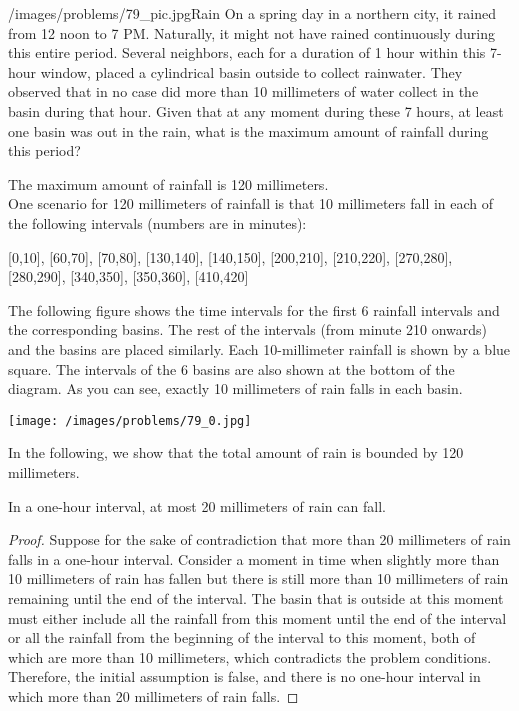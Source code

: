 \begin{problem}{/images/problems/79_pic.jpg}{Rain} On a spring day in a northern city, it rained from 12 noon to 7 PM. Naturally, it might not have rained continuously during this entire period. Several neighbors, each for a duration of 1 hour within this 7-hour window, placed a cylindrical basin outside to collect rainwater. They observed that in no case did more than 10 millimeters of water collect in the basin during that hour. Given that at any moment during these 7 hours, at least one basin was out in the rain, what is the maximum amount of rainfall during this period?
\end{problem}

\begin{solution}
The maximum amount of rainfall is 120 millimeters.\\[0.2cm]

One scenario for 120 millimeters of rainfall is that 10 millimeters fall in each of the following intervals (numbers are in minutes):

[0,10], [60,70], [70,80], [130,140], [140,150], [200,210], [210,220], [270,280], [280,290], [340,350], [350,360], [410,420]

The following figure shows the time intervals for the first 6 rainfall intervals and the corresponding basins. The rest of the intervals (from minute 210 onwards) and the basins are placed similarly. Each 10-millimeter rainfall is shown by a blue square. The intervals of the 6 basins are also shown at the bottom of the diagram. As you can see, exactly 10 millimeters of rain falls in each basin.

\begin{center}
\texttt{[image: /images/problems/79\_0.jpg]}
\end{center}

In the following, we show that the total amount of rain is bounded by 120 millimeters.

\begin{lemma}\label{lm:1}
In a one-hour interval, at most 20 millimeters of rain can fall.
\end{lemma}
\begin{proof}
Suppose for the sake of contradiction that more than 20 millimeters of rain falls in a one-hour interval. Consider a moment in time when slightly more than 10 millimeters of rain has fallen but there is still more than 10 millimeters of rain remaining until the end of the interval. The basin that is outside at this moment must either include all the rainfall from this moment until the end of the interval or all the rainfall from the beginning of the interval to this moment, both of which are more than 10 millimeters, which contradicts the problem conditions. Therefore, the initial assumption is false, and there is no one-hour interval in which more than 20 millimeters of rain falls.
\end{proof}


\end{solution}
